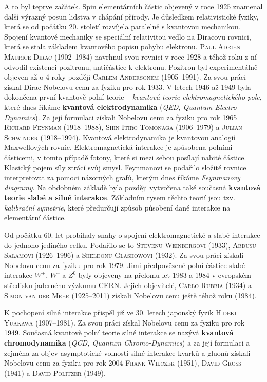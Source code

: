     A to byl teprve začátek. Spin elementárních částic objevený v roce 1925 znamenal další výrazný
    posun lidstva v chápání přírody. Je důsledkem relativistické fyziky, která se od počátku 20.
    století rozvíjela paralelně s kvantovou mechanikou. Spojení kvantové mechaniky se speciální
    relativitou vedlo na Diracovu rovnici, která se stala základem kvantového popisu pohybu
    elektronu. \textsc{Paul Adrien Maurice Dirac} (1902–1984) navrhnul svou rovnici v roce 1928 a
    téhož roku z ní odvodil existenci pozitronu, antičástice k elektronu. Pozitron byl
    experimentálně objeven až o 4 roky později \textsc{Carlem Andersonem} (1905–1991). Za svou práci
    získal Dirac Nobelovu cenu za fyziku pro rok 1933. V letech 1946 až 1949 byla dokončena první
    kvantově polní teorie – \emph{kvantová teorie elektromagnetického pole}, které dnes říkáme
    \textbf{kvantová elektrodynamika} (\emph{QED, Quantum Electro-Dynamics}). Za její formulaci
    získali Nobelovu cenu za fyziku pro rok 1965 \textsc{Richard Feynman} (1918–1988),
    \textsc{Shin-Itiro Tomonaga} (1906–1979) a \textsc{Julian Schwinger} (1918–1994). Kvantová
    elektrodynamika je kvantovou analogií Maxwellových rovnic. Elektromagnetická interakce je
    způsobena polními částicemi, v tomto případě fotony, které si mezi sebou posílají nabité
    částice. Klasický pojem síly ztrácí svůj smysl. Feynmanovi se podařilo složité rovnice
    interpretovat za pomoci názorných grafů, kterým dnes říkáme \emph{Feynmanovy diagramy}. Na
    obdobném základě byla později vytvořena také současná \textbf{kvantová teorie slabé a silné
    interakce}. Základním rysem těchto teorií jsou tzv. \emph{kalibrační symetrie}, které předurčují
    způsob působení dané interakce na elementární částice.

    Od počátku 60. let probíhaly snahy o spojení elektromagnetické a slabé interakce do jednoho
    jediného celku. Podařilo se to \textsc{Stevenu Weinbergovi} (1933), \textsc{Abdusu Salamovi}
    (1926–1996) a \textsc{Sheldonu Glashowovi} (1932). Za svou práci získali Nobelovu cenu za fyziku
    pro rok 1979. Jimi předpovězené polní částice slabé interakce \(W^+\), \(W^–\) a \(Z^0\) byly
    objeveny na přelomu let 1983 a 1984 v evropském středisku jaderného výzkumu CERN. Jejich
    objevitelé, \textsc{Carlo Rubbia} (1934) a \textsc{Simon van der Meer} (1925–2011) získali
    Nobelovu cenu ještě téhož roku (1984).

    K pochopení silné interakce přispěl již ve 30. letech japonský fyzik \textsc{Hideki Yuakawa}
    (1907–1981). Za svou práci získal Nobelovu cenu za fyziku pro rok 1949. Současná kvantově polní
    teorie silné interakce se nazývá \textbf{kvantová chromodynamika} (\emph{QCD, Quantum
    Chromo-Dynamics}) a za její formulaci a zejména za objev asymptotické volnosti silné interakce
    kvarků a gluonů získali Nobelovu cenu za fyziku pro rok 2004 \textsc{Frank Wilczek} (1951),
    \textsc{David Gross} (1941) a \textsc{David Politzer} (1949).
    
